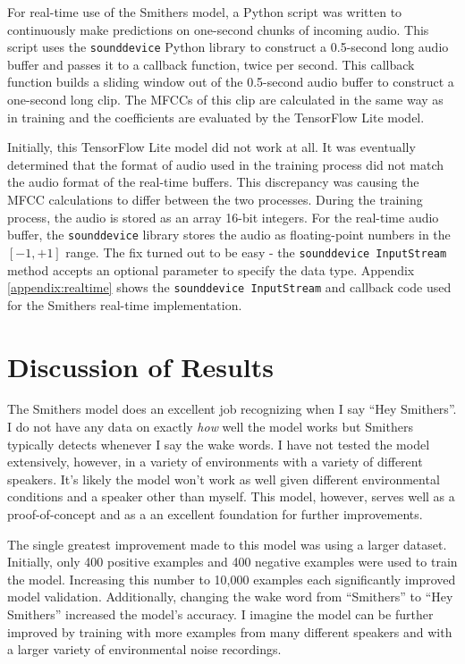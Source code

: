 \documentclass[conference]{IEEEtran}
\newcommand{\code}[1]{\texttt{#1}}
\begin{document}
For real-time use of the Smithers model, a Python script was written
to continuously make predictions on one-second chunks of incoming audio.
This script uses the \code{sounddevice} Python library to construct a
0.5-second long audio buffer and passes it to a callback function, twice per second.
This callback function builds a sliding window out of the 0.5-second audio buffer
to construct a one-second long clip.
The MFCCs of this clip are calculated in the same way as in training
and the coefficients are evaluated by the TensorFlow Lite model.

Initially, this TensorFlow Lite model did not work at all.
It was eventually determined that the format of audio used in the training process
did not match the audio format of the real-time buffers.
This discrepancy was causing the MFCC calculations to differ between the two processes.
During the training process, the audio is stored as an array 16-bit integers.
For the real-time audio buffer, the \code{sounddevice} library stores the audio
as floating-point numbers in the $[-1,+1]$ range.
The fix turned out to be easy - the \code{sounddevice InputStream} method
accepts an optional parameter to specify the data type.
Appendix \ref{appendix:realtime} shows the \code{sounddevice InputStream}
and callback code used for the Smithers real-time implementation.


\section{Discussion of Results}

The Smithers model does an excellent job recognizing when I say ``Hey Smithers''.
I do not have any data on exactly \textit{how} well the model works
but Smithers typically detects whenever I say the wake words.
I have not tested the model extensively, however, in a variety of environments
with a variety of different speakers.
It's likely the model won't work as well given different environmental conditions
and a speaker other than myself.
This model, however, serves well as a proof-of-concept and as a an excellent foundation
for further improvements.

The single greatest improvement made to this model was using a larger dataset.
Initially, only 400 positive examples and 400 negative examples were used to train the model.
Increasing this number to 10,000 examples each significantly improved model validation.
Additionally, changing the wake word from ``Smithers'' to ``Hey Smithers'' increased 
the model's accuracy.
I imagine the model can be further improved by training with more examples
from many different speakers and with a larger variety of environmental noise recordings.
\end{document}
